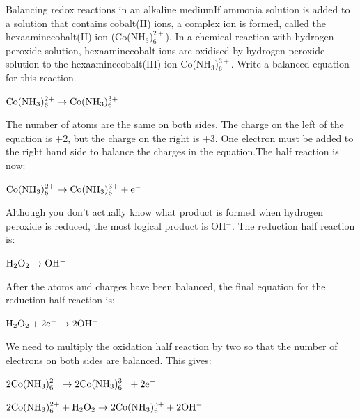 \begin{wex}{Balancing redox reactions in an alkaline medium}{If ammonia solution is added to a solution that contains cobalt(II) ions, a complex ion is formed, called the hexaaminecobalt(II) ion (Co(NH$_{3}$)$_{6}^{2+}$). In a chemical reaction with hydrogen peroxide solution, hexaaminecobalt ions are oxidised by hydrogen peroxide solution to the hexaaminecobalt(III) ion Co(NH$_{3}$)$_{6}^{3+}$. Write a balanced equation for this reaction.}{
\begin{center}
$\rm{Co(NH_{3})_{6}^{2+} \rightarrow Co(NH_{3})_{6}^{3+}}$
\end{center}
The number of atoms are the same on both sides.
The charge on the left of the equation is +2, but the charge on the right is +3. One electron must be added to the right hand side to balance the charges in the equation.The half reaction is now:
\begin{center}
$\rm{Co(NH_{3})_{6}^{2+} \rightarrow Co(NH_{3})_{6}^{3+} + e^{-}}$
\end{center}
Although you don't actually know what product is formed when hydrogen peroxide is reduced, the most logical product is OH$^{-}$. The reduction half reaction is:
\begin{center}
$\rm{H_{2}O_{2} \rightarrow OH^{-}}$
\end{center}
After the atoms and charges have been balanced, the final equation for the reduction half reaction is:
\begin{center}
$\rm{H_{2}O_{2} + 2e^{-} \rightarrow 2OH^{-}}$
\end{center}
We need to multiply the oxidation half reaction by two so that the number of electrons on both sides are balanced. This gives:
\begin{center}
$\rm{2Co(NH_{3})_{6}^{2+} \rightarrow 2Co(NH_{3})_{6}^{3+} + 2e^{-}}$
\end{center}
\begin{center}
$\rm{2Co(NH_{3})_{6}^{2+} + H_{2}O_{2} \rightarrow 2Co(NH_{3})_{6}^{3+} + 2OH^{-}}$
\end{center}
}
\end{wex}

